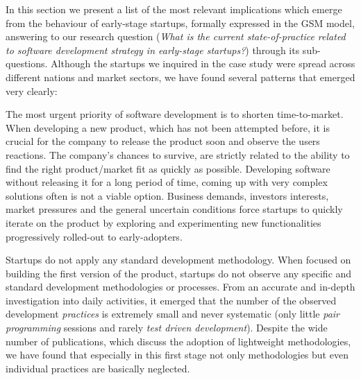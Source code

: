 \documentclass[10pt,journal,letterpaper,compsoc]{IEEEtran}
\begin{document}
In this section we present a list of the most relevant implications which 
emerge from the behaviour of early-stage startups, formally expressed in the GSM 
model, answering to our research question (\textit{What is the current 
state-of-practice related to software development strategy in early-stage 
startups?}) through its sub-questions. Although the startups we inquired in the 
case study were spread across different nations and market sectors, we have 
found several patterns that emerged very clearly:

\begin{compactitem}
 

\item The most urgent priority of software development is to shorten 
time-to-market. When developing a new product, which has not been attempted 
before, it is crucial for the company to release the product soon and observe 
the users reactions. The company's chances to survive, are strictly related to 
the ability to find the right product/market fit as quickly as possible. 
Developing software without releasing it for a long period of time, coming up 
with very complex solutions often is not a viable option. Business demands, 
investors interests, market pressures and the general uncertain conditions force 
startups to quickly iterate on the product by exploring and experimenting new 
functionalities progressively rolled-out to early-adopters.


\item Startups do not apply any standard development methodology. When focused 
on building the first version of the product, startups do not observe any 
specific and standard development methodologies or processes.  From an accurate 
and in-depth investigation into daily activities, it emerged that the number of  
the observed development \textit{practices} is extremely small and never 
systematic (only little \textit{pair programming} sessions and rarely 
\textit{test driven development}). Despite the wide number of publications, 
which discuss the adoption of lightweight methodologies, we have found that 
especially in this first stage not only methodologies but even individual 
practices are basically neglected. 


\end{compactitem}
\end{document}
